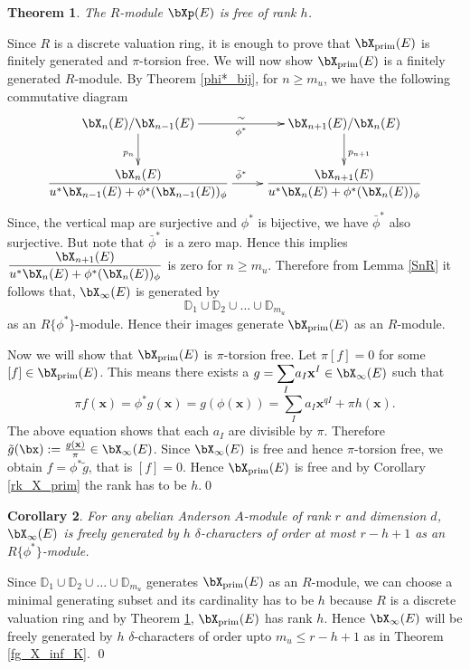 \documentclass{amsart}
\def \d{\delta}
\newtheorem {theorem} {\bf{Theorem}}[section]
\newtheorem {corollary}[theorem] {\bf Corollary}
\numberwithin {equation}{section}
\def \d{\delta} \def \bZ{{\mathbb Z}} \def \bV{{\mathcal V}} \def \bF{{\bf F}}
\begin{document}
\begin{theorem}\label{X_prim} 
The $R$-module $\bXp(E)$ is free of rank $h$.
\end{theorem}
 \proof Since $R$ is a discrete valuation ring, it is enough to prove that ${\bX}_{\mathrm{prim}}(E)$ is finitely generated and $\pi$-torsion free.
We will now show ${\bX}_{\mathrm{prim}}(E)$ is a finitely generated $R$-module.
By Theorem \ref{phi*_bij}, for $n\geq m_{u}$, we have the following commutative diagram
 $${
\xymatrix{
{\bX}_{n}(E)/{\bX}_{n-1}(E)\ar[d]_{p_{n}} \ar[r]_{\phi^{*}}^{\sim} &{\bX}_{n+1}(E)/{\bX}_{n}(E)\ar[d]^{p_{n+1}}  \\
\dfrac{{\bX}_{n}(E)}{u^{*}{\bX}_{n-1}(E)+\phi^{*}({\bX}_{n-1}(E))_{\phi}} \ar[r]^{\bar{\phi}^{*}} &\dfrac{{\bX}_{n+1}(E)}{u^{*}{\bX}_{n}(E)+\phi^{*}({\bX}_{n}(E))_{\phi}}}}
$$
Since, the vertical map are surjective and $\phi^{*}$ is bijective, we have $\bar{\phi}^{*}$ also surjective. But note that $\bar{\phi}^{*}$ is a zero map. Hence this implies $\dfrac{{\bX}_{n+1}(E)}{u^{*}{\bX}_{n}(E)+\phi^{*}({\bX}_{n}(E))_{\phi}}$ is zero for $n\geq m_{u}$. 
Therefore from Lemma \ref{SnR} it follows that, $\bX_{\infty}(E)$ is generated by $$\mathbb{D}_{1}\cup \mathbb{D}_{2}\cup \ldots \cup \mathbb{D}_{m_{u}}$$ 
as an $R\{\phi^{*}\}$-module. Hence their images generate ${\bX}_{\mathrm{prim}}(E)$ as an $R$-module.

Now we will show that ${\bX}_{\mathrm{prim}}(E)$ is $\pi$-torsion free.
Let $\pi [f] =0$ for some $[f] \in \bX_{\mathrm{prim}}(E)$. This means there exists a $g=\displaystyle{\sum_{I}}a_{I}\mathbf{x}^{I} \in \bX_{\infty}(E)$ such that 
\begin{equation*}
\pi f(\mathbf{x})=\phi^{*}g (\mathbf{x})= g(\phi(\mathbf{x}))=\displaystyle{\sum_{I}}a_{I}\mathbf{x}^{qI}+\pi h(\mathbf{x}).
\end{equation*}
The above equation shows that each $a_{I}$ are divisible by $\pi$. Therefore 
$\tilde{g}(\bx):=\frac{g(\mathbf{x})}{\pi}\in \bX_{\infty}(E)$. Since $\bX_{\infty}(E)$ is free and hence $\pi$-torsion free, we obtain $f=\phi^{*}\tilde{g}$,
that is $[f] =0$. 
Hence ${\bX}_{\mathrm{prim}}(E)$ is free and by Corollary \ref{rk_X_prim} the rank has to be $h$.\qed



\begin{corollary}
\label{FinGenX}
For any abelian Anderson $A$-module of rank $r$ and dimension $d$, ${\bX}_{\infty}(E)$  is  freely generated  
by $h$ $\d$-characters of order at most $r-h+1$ as an 
$R\{\phi^*\}$-module.
\end{corollary}
\proof Since $ \mathbb{D}_{1}\cup\mathbb{D}_{2}\cup \ldots \cup \mathbb{D}_{m_{u}}$ generates ${\bX}_{\mathrm{prim}}(E)$ as an $R$-module, we can choose a minimal generating subset and its cardinality has to be $h$ because $R$ is a 
discrete valuation ring and by Theorem \ref{X_prim}, ${\bX}_{\mathrm{prim}}(E)$ has rank $h$.
Hence $\bX_{\infty}(E)$ will be freely generated by $h$ $\d$-characters of order upto $m_{u}\leq r-h+1$ as in Theorem \ref{fg_X_inf_K}.
\qed
\end{document}
